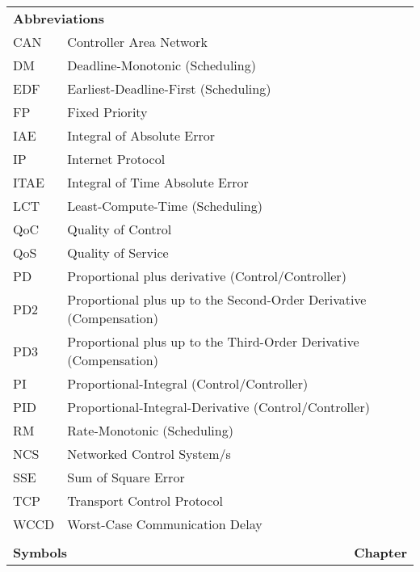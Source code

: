 


{
\renewcommand{\arraystretch}{1.2} 
\begin{longtable}{llr}
\multicolumn{3}{l}{\textbf{Abbreviations}\hspace{0.4\textwidth}~~}\\
CAN & Controller Area Network\\
DM & Deadline-Monotonic (Scheduling) \\
EDF & Earliest-Deadline-First (Scheduling)\\
FP & Fixed Priority\\
IAE & Integral of Absolute Error\\
IP & Internet Protocol\\
ITAE & Integral of Time Absolute Error\\
LCT & Least-Compute-Time (Scheduling)\\
QoC & Quality of Control\\
QoS & Quality of Service\\
PD & \multicolumn{2}{l}{Proportional plus derivative (Control/Controller)}\\
PD2 & \multicolumn{2}{l}{Proportional plus up to the Second-Order Derivative (Compensation)}\\
PD3 & \multicolumn{2}{l}{Proportional plus up to the Third-Order Derivative (Compensation)}\\
PI &\multicolumn{2}{l}{ Proportional-Integral (Control/Controller)}\\
PID & \multicolumn{2}{l}{Proportional-Integral-Derivative (Control/Controller)}\\
RM & Rate-Monotonic (Scheduling)\\
NCS & Networked Control System/s\\
SSE & Sum of Square Error\\
TCP & Transport Control Protocol\\
WCCD & Worst-Case Communication Delay\\
\\
\multicolumn{2}{l}{\textbf{Symbols}} \hspace{0.4\textwidth}~& {\bf Chapter}\\

\end{longtable}}
